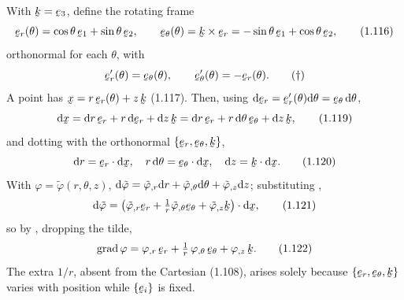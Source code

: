 \begin{example}\label{ex:polar}
With $\bk=\be_3$, define the rotating frame
\begin{equation}
\ber(\theta)=\cos\theta\,\be_1+\sin\theta\,\be_2,\qquad
\beth(\theta)=\bk\times\ber=-\sin\theta\,\be_1+\cos\theta\,\be_2, \tag{1.116}\label{eq:1.116}
\end{equation}
orthonormal for each $\theta$, with
\begin{equation}
\ber'(\theta)=\beth(\theta),\qquad \beth'(\theta)=-\ber(\theta). \tag{$\dagger$}
\end{equation}
A point has $\bx=r\,\ber(\theta)+z\,\bk$ (1.117). Then, using
$\dl\ber=\ber'(\theta)\dl\theta=\beth\,\dl\theta$,
\begin{equation}
\dl\bx=\dl r\,\ber+r\,\dl\ber+\dl z\,\bk
=\dl r\,\ber+r\,\dl\theta\,\beth+\dl z\,\bk, \tag{1.119}\label{eq:1.119}
\end{equation}
and dotting with the orthonormal $\{\ber,\beth,\bk\}$,
\begin{equation}
\dl r=\ber\cdot\dl\bx,\quad r\,\dl\theta=\beth\cdot\dl\bx,\quad
\dl z=\bk\cdot\dl\bx. \tag{1.120}\label{eq:1.120}
\end{equation}
With $\varphi=\tilde\varphi(r,\theta,z)$,
$\mathrm{d}\tilde\varphi=\tilde\varphi_{,r}\mathrm{d} r+\tilde\varphi_{,\theta}\mathrm{d}\theta
+\tilde\varphi_{,z}\mathrm{d} z$; substituting ,
\begin{equation}
\dl\tilde\varphi=\big(\tilde\varphi_{,r}\ber
+\tfrac1r\tilde\varphi_{,\theta}\beth+\tilde\varphi_{,z}\bk\big)\cdot\dl\bx,
\tag{1.121}\label{eq:1.121}
\end{equation}
so by , dropping the tilde,
\begin{equation}
\grad\varphi=\varphi_{,r}\,\ber+\tfrac1r\,\varphi_{,\theta}\,\beth
+\varphi_{,z}\,\bk. \tag{1.122}\label{eq:1.122}
\end{equation}
The extra $1/r$, absent from the Cartesian (1.108), arises solely because
$\{\ber,\beth,\bk\}$ varies with position while $\{\be_i\}$ is fixed.
\end{example}

